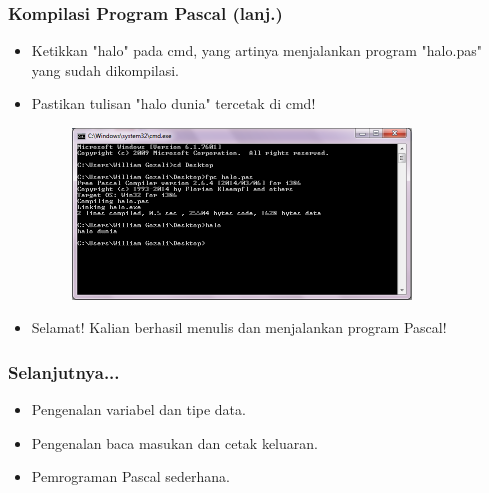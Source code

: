 \documentclass{beamer}
\begin{document}
\begin{frame}
\frametitle{Kompilasi Program Pascal (lanj.)}
\begin{itemize}
	\item Ketikkan "halo" pada cmd, yang artinya menjalankan program "halo.pas" yang sudah dikompilasi.
	\item Pastikan tulisan "halo dunia" tercetak di cmd!
	\begin{figure}
		\includegraphics[width=9cm]{asset/hello_4.PNG}
	\end{figure}
	\item Selamat! Kalian berhasil menulis dan menjalankan program Pascal!
\end{itemize}
\end{frame}

\begin{frame}
\frametitle{Selanjutnya...}
\begin{itemize}
	\item Pengenalan variabel dan tipe data.
	\item Pengenalan baca masukan dan cetak keluaran.
	\item Pemrograman Pascal sederhana.
\end{itemize}
\end{frame}
\end{document}
